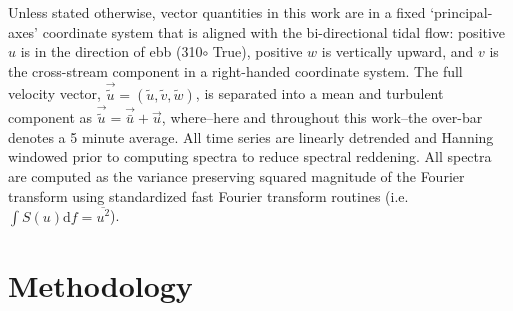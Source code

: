 \documentclass[twocol]{ametsoc}
\begin{document}
Unless stated otherwise, vector quantities in this work are in a fixed `principal-axes' coordinate system that is aligned with the bi-directional tidal flow: positive $u$ is in the direction of ebb (310$\circ$ True), positive $w$ is vertically upward, and $v$ is the cross-stream component in a right-handed coordinate system. The full velocity vector, $\vec{\tilde{u}} = (\tilde{u}, \tilde{v}, \tilde{w})$, is separated into a mean and turbulent component as $\vec{\tilde{u}} = \vec{\bar{u}} + \vec{u}$, where--here and throughout this work--the over-bar denotes a 5 minute average.  All time series are linearly detrended and Hanning windowed prior to computing spectra to reduce spectral reddening. All spectra are computed as the variance preserving squared magnitude of the Fourier transform using standardized fast Fourier transform routines (i.e. $\int S(u)\mathrm{d}f = \overline{u^2}$).

\section{Methodology}
\label{sec:methods}

\end{document}
